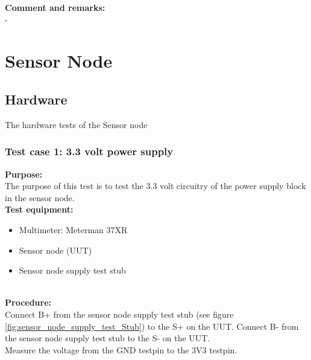 \textbf{Comment and remarks:}\\
-\\

\section{Sensor Node}
\subsection{Hardware}
The hardware tests of the Sensor node
\subsubsection{Test case 1: 3.3 volt power supply}
\textbf{Purpose:}\\
The purpose of this test is to test the 3.3 volt circuitry of the power supply block in the sensor node.\\

\textbf{Test equipment:}
\begin{itemize}
\item Multimeter: Meterman 37XR
\item Sensor node (UUT)
\item Sensor node supply test stub
\end{itemize}
\ \\
\textbf{Procedure:}\\
Connect B+ from the sensor node supply test stub (see figure \ref{fig:sensor_node_supply_test_Stub}) to the S+ on the UUT. Connect B- from the sensor node supply test stub to the S- on the UUT.\\
Measure the voltage from the GND testpin to the 3V3 testpin.

